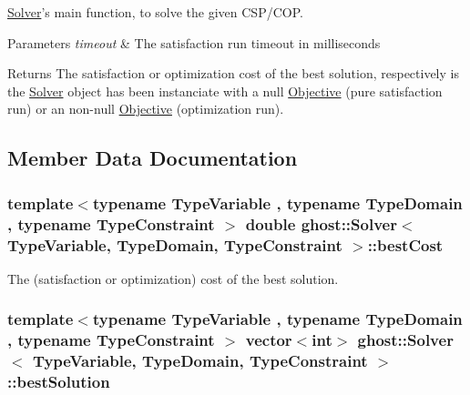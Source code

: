 \hyperlink{classghost_1_1Solver}{Solver}'s main function, to solve the given C\-S\-P/\-C\-O\-P. 


\begin{DoxyParams}{Parameters}
{\em timeout} & The satisfaction run timeout in milliseconds \\
\hline
\end{DoxyParams}
\begin{DoxyReturn}{Returns}
The satisfaction or optimization cost of the best solution, respectively is the \hyperlink{classghost_1_1Solver}{Solver} object has been instanciate with a null \hyperlink{classghost_1_1Objective}{Objective} (pure satisfaction run) or an non-\/null \hyperlink{classghost_1_1Objective}{Objective} (optimization run). 
\end{DoxyReturn}


\subsection{Member Data Documentation}
\hypertarget{classghost_1_1Solver_a2fa5cf25d3417e3046aad3c1123320ed}{
\subsubsection[{best\-Cost}]{\setlength{\rightskip}{0pt plus 5cm}template$<$typename Type\-Variable , typename Type\-Domain , typename Type\-Constraint $>$ double {\bf ghost\-::\-Solver}$<$ Type\-Variable, Type\-Domain, Type\-Constraint $>$\-::best\-Cost\hspace{0.3cm}{\ttfamily [private]}}}\label{classghost_1_1Solver_a2fa5cf25d3417e3046aad3c1123320ed}


The (satisfaction or optimization) cost of the best solution. 

\hypertarget{classghost_1_1Solver_aea123e5069f4a6d20528b23a4e99d41d}{
\subsubsection[{best\-Solution}]{\setlength{\rightskip}{0pt plus 5cm}template$<$typename Type\-Variable , typename Type\-Domain , typename Type\-Constraint $>$ vector$<$int$>$ {\bf ghost\-::\-Solver}$<$ Type\-Variable, Type\-Domain, Type\-Constraint $>$\-::best\-Solution\hspace{0.3cm}{\ttfamily [private]}}}\label{classghost_1_1Solver_aea123e5069f4a6d20528b23a4e99d41d}


